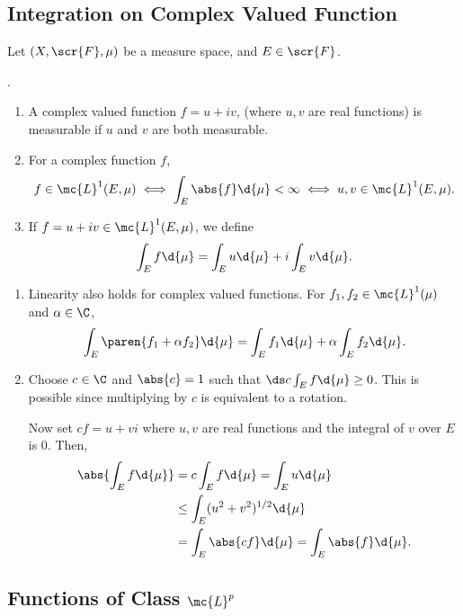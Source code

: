 
\subsection*{Integration on Complex Valued Function}

Let \((X, \scr{F}, \mu)\) be a measure space, and \(E \in \scr{F}\).

.
\begin{enumerate}
    \item A complex valued function \(f = u + iv\), (where \(u, v\) are real functions) is measurable if \(u\) and \(v\) are both measurable.
    \item For a complex function \(f\),
          \[
              f \in \mc{L}^{1}(E, \mu) \iff  \int_E \abs{f} \d{\mu} < \infty \iff u, v \in \mc{L}^{1}(E, \mu).
          \]
    \item If \(f = u + iv \in \mc{L}^{1}(E, \mu)\), we define
          \[
              \int_E f \d{\mu} = \int_E u \d{\mu} + i\int_E v \d{\mu}.
          \]
\end{enumerate}

\rmk
\begin{enumerate}
    \item Linearity also holds for complex valued functions. For \(f_1, f_2 \in \mc{L}^{1}(\mu)\) and \(\alpha \in \C\),
          \[
              \int_E \paren{f_1 + \alpha f_2} \d{\mu} = \int_E f_1 \d{\mu} +  \alpha \int_E f_2 \d{\mu}.
          \]
    \item Choose \(c \in \C\) and \(\abs{c} = 1\) such that \(\ds c \int_E f \d{\mu} \geq 0\). This is possible since multiplying by \(c\) is equivalent to a rotation.

          Now set \(cf = u + vi\) where \(u, v\) are real functions and the integral of \(v\) over \(E\) is 0. Then,
          \[
              \begin{aligned}
                  \abs{\int_E f \d{\mu}} & = c \int_E f\d{\mu} = \int_E u \d{\mu}              \\
                                         & \leq \int_E (u^2+v^2)^{1/2} \d{\mu}                 \\
                                         & = \int_E \abs{cf} \d{\mu} = \int_E \abs{f} \d{\mu}.
              \end{aligned}
          \]
\end{enumerate}

\subsection*{Functions of Class \(\mc{L}^{p}\)}

